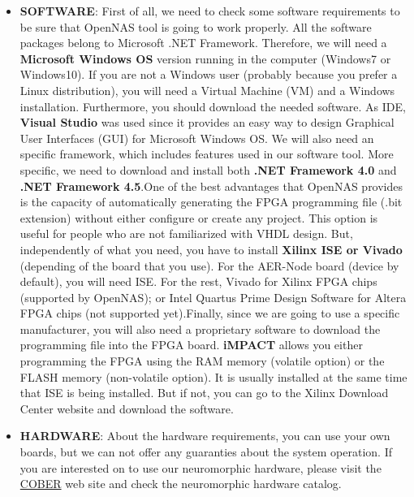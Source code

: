 \begin{itemize}
    \item \textbf{SOFTWARE}: First of all, we need to check some software requirements to be sure that OpenNAS tool is going to work properly. All the software packages belong to Microsoft .NET Framework. Therefore, we will need a \textbf{Microsoft Windows OS} version running in the computer (Windows7 or Windows10). If you are not a Windows user (probably because you prefer a Linux distribution), you will need a Virtual Machine (VM) and a Windows installation. Furthermore, you should download the needed software. As IDE, \textbf{Visual Studio} was used since it provides an easy way to design Graphical User Interfaces (GUI) for Microsoft Windows OS. We will also need an specific framework, which includes features used in our software tool. More specific, we need to download and install both \textbf{.NET Framework 4.0} and \textbf{.NET Framework 4.5}.One of the best advantages that OpenNAS provides is the capacity of automatically generating the FPGA programming file (.bit extension) without either configure or create any project. This option is useful for people who are not familiarized with VHDL design. But, independently of what you need, you have to install \textbf{Xilinx ISE or Vivado} (depending of the board that you use). For the AER-Node board (device by default), you will need ISE. For the rest, Vivado for Xilinx FPGA chips (supported by OpenNAS); or Intel Quartus Prime Design Software for Altera FPGA chips (not supported yet).Finally, since we are going to use a specific manufacturer, you will also need a proprietary software to download the programming file into the FPGA board. \textbf{iMPACT} allows you either programming the FPGA using the RAM memory (volatile option) or the FLASH memory (non-volatile option). It is usually installed at the same time that ISE is being installed. But if not, you can go to the Xilinx Download Center website and download the software.
    
    \item \textbf{HARDWARE}: About the hardware requirements, you can use your own boards, but we can not offer any guaranties about the system operation. If you are interested on to use our neuromorphic hardware, please visit the \textcolor{blue}{\href{https://www.t-cober.es}{COBER}} web site and check the neuromorphic hardware catalog.
    
\end{itemize}




